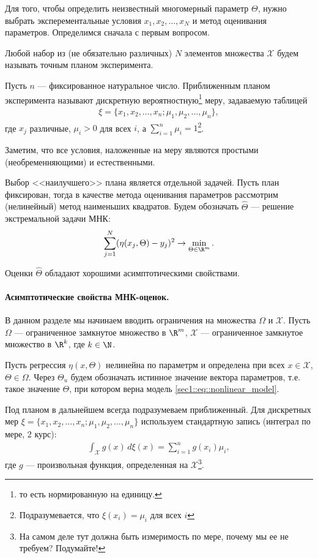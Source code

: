 Для того, чтобы определить неизвестный многомерный параметр $\Theta$, нужно выбрать эксперементальные условия $x_1, x_2, \ldots, x_N$ и метод
оценивания параметров. Определимся сначала с первым вопросом.
\begin{dfn}
    Любой набор из (не обязательно различных) $N$ элементов множества $\mathcal X$ будем называть точным планом эксперимента.
\end{dfn}
\begin{dfn}
    Пусть $n$ --- фиксированное натуральное число.
    Приближенным планом эксперимента называют дискретную вероятностную\footnote{то есть нормированную на единицу.} меру, задаваемую таблицей
    \begin{gather}
        \xi = \{x_1, x_2, \ldots, x_n; \mu_1, \mu_2, \ldots, \mu_n\},
    \end{gather}
    где $x_j$ различные, $\mu_i > 0$ для всех $i$, а $\sum_{i=1}^n \mu_i = 1$\footnote{Подразумевается, что $\xi(x_i) = \mu_i$ для всех $i$}.
\end{dfn}
Заметим, что все условия, наложенные на меру являются простыми (необременняющими) и естественными.

Выбор <<наилучшего>> плана является отдельной задачей. Пусть план фиксирован, тогда в качестве метода оценивания параметров рассмотрим (нелинейный)
метод наименьших квадратов.
Будем обозначать $\hat \Theta$ --- решение экстремальной задачи МНК:
\begin{gather*}
    \sum_{j = 1}^N (\eta(x_j, \Theta) - y_j)^2 \to \min_{\Theta \in \R^m}.
\end{gather*}

Оценки $\hat \Theta$ обладают хорошими асимптотическими свойствами.

\paragraph{Асимптотические свойства МНК-оценок.}
В данном разделе мы начинаем вводить ограничения на множества $\Omega$ и $\mathcal X$.
Пусть $\Omega$ --- ограниченное замкнутое множество в $\R^m$, $\mathcal X$ --- ограниченное замкнутое множество в $\R^k$,
где $k \in \N$.

Пусть регрессия $\eta(x, \Theta)$ нелинейна по параметрм и определена при всех $x \in \mathcal X$, $\Theta \in \Omega$.
Через $\Theta_u$ будем обозначать истинное значение вектора параметров, т.е. такое значение $\Theta$, при котором верна модель
\eqref{sec1::eq::nonlinear_model}.

Под планом в дальнейшем всегда подразумеваем приближенный. Для дискретных мер $\xi = \{x_1, x_2, \ldots, x_n; \mu_1, \mu_2, \ldots, \mu_n\}$
используем стандартную запись (интеграл по мере, 2 курс):
\begin{gather*}
\int_\mathcal X g(x)\, d\xi(x) = \sum_{i = 1}^n g(x_i) \mu_i,
\end{gather*}
где $g$ --- произвольная функция, определенная на $\mathcal X$\footnote{На самом деле тут должна быть измеримость по мере, почему мы ее не требуем? Подумайте!}.

